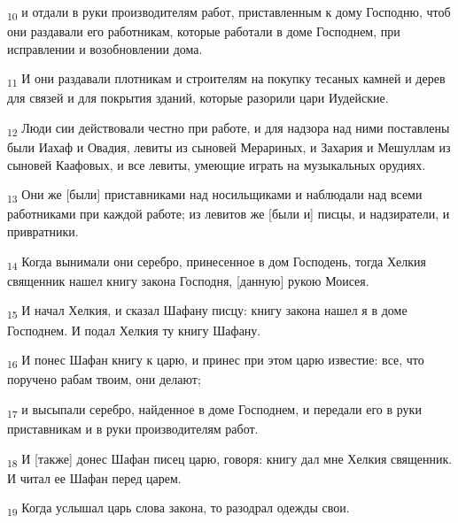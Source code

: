 \begin{tcolorbox}
\textsubscript{10} и отдали в руки производителям работ, приставленным к дому Господню, чтоб они раздавали его работникам, которые работали в доме Господнем, при исправлении и возобновлении дома.
\end{tcolorbox}
\begin{tcolorbox}
\textsubscript{11} И они раздавали плотникам и строителям на покупку тесаных камней и дерев для связей и для покрытия зданий, которые разорили цари Иудейские.
\end{tcolorbox}
\begin{tcolorbox}
\textsubscript{12} Люди сии действовали честно при работе, и для надзора над ними поставлены были Иахаф и Овадия, левиты из сыновей Мерариных, и Захария и Мешуллам из сыновей Каафовых, и все левиты, умеющие играть на музыкальных орудиях.
\end{tcolorbox}
\begin{tcolorbox}
\textsubscript{13} Они же [были] приставниками над носильщиками и наблюдали над всеми работниками при каждой работе; из левитов же [были и] писцы, и надзиратели, и привратники.
\end{tcolorbox}
\begin{tcolorbox}
\textsubscript{14} Когда вынимали они серебро, принесенное в дом Господень, тогда Хелкия священник нашел книгу закона Господня, [данную] рукою Моисея.
\end{tcolorbox}
\begin{tcolorbox}
\textsubscript{15} И начал Хелкия, и сказал Шафану писцу: книгу закона нашел я в доме Господнем. И подал Хелкия ту книгу Шафану.
\end{tcolorbox}
\begin{tcolorbox}
\textsubscript{16} И понес Шафан книгу к царю, и принес при этом царю известие: все, что поручено рабам твоим, они делают;
\end{tcolorbox}
\begin{tcolorbox}
\textsubscript{17} и высыпали серебро, найденное в доме Господнем, и передали его в руки приставникам и в руки производителям работ.
\end{tcolorbox}
\begin{tcolorbox}
\textsubscript{18} И [также] донес Шафан писец царю, говоря: книгу дал мне Хелкия священник. И читал ее Шафан перед царем.
\end{tcolorbox}
\begin{tcolorbox}
\textsubscript{19} Когда услышал царь слова закона, то разодрал одежды свои.
\end{tcolorbox}
